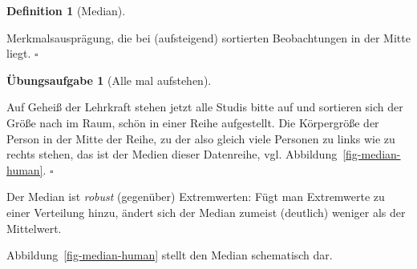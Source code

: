 \documentclass[
  letterpaper,
]{scrbook}
\theoremstyle{definition}
\newtheorem{exercise}{Übungsaufgabe}[chapter]
\theoremstyle{definition}
\theoremstyle{definition}
\newtheorem{definition}{Definition}[chapter]
\theoremstyle{remark}
\begin{document}
\begin{definition}[Median]\protect\hypertarget{def-median}{}\label{def-median}

Merkmalsausprägung, die bei (aufsteigend) sortierten Beobachtungen in
der Mitte liegt. \(\square\)

\end{definition}

\begin{exercise}[Alle mal
aufstehen]\protect\hypertarget{exr-aufstellen}{}\label{exr-aufstellen}

Auf Geheiß der Lehrkraft stehen jetzt alle Studis bitte auf und
sortieren sich der Größe nach im Raum, schön in einer Reihe aufgestellt.
Die Körpergröße der Person in der Mitte der Reihe, zu der also gleich
viele Personen zu links wie zu rechts stehen, das ist der Medien dieser
Datenreihe, vgl. Abbildung~\ref{fig-median-human}. \(\square\)

\end{exercise}

Der Median ist \emph{robust} (gegenüber) Extremwerten: Fügt man
Extremwerte zu einer Verteilung hinzu, ändert sich der Median zumeist
(deutlich) weniger als der Mittelwert.

Abbildung~\ref{fig-median-human} stellt den Median schematisch dar.
\end{document}
